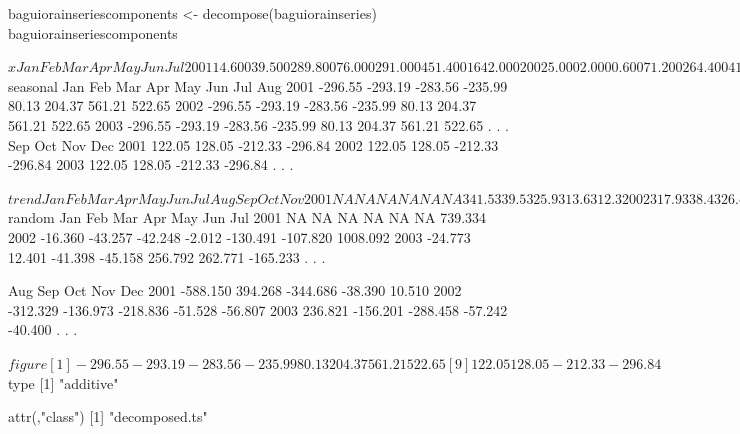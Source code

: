 \begin{center}
\begin{Schunk}
\begin{Sinput}
baguiorainseriescomponents <- decompose(baguiorainseries)
baguiorainseriescomponents
\end{Sinput}
\begin{Soutput}
$x
          Jan      Feb      Mar      Apr      May      Jun      Jul
2001   14.600   39.500  289.800   76.000  291.000  451.400 1642.000
2002    5.000    2.000    0.600   71.200  264.400  411.000 1883.400
2003    9.800   25.400    4.800   46.800  662.700  792.400  721.300
.
.
.

          Aug      Sep      Oct      Nov      Dec
2001  274.000  842.200   97.000   61.600   23.200
2002  525.600  301.500  224.800   67.300   10.000
2003 1089.400  303.200  179.700   60.400    4.400
.
.
.

$seasonal
         Jan     Feb     Mar     Apr     May     Jun     Jul     Aug
2001 -296.55 -293.19 -283.56 -235.99   80.13  204.37  561.21  522.65
2002 -296.55 -293.19 -283.56 -235.99   80.13  204.37  561.21  522.65
2003 -296.55 -293.19 -283.56 -235.99   80.13  204.37  561.21  522.65
.
.
.
         Sep     Oct     Nov     Dec
2001  122.05  128.05 -212.33 -296.84
2002  122.05  128.05 -212.33 -296.84
2003  122.05  128.05 -212.33 -296.84
.
.
.

$trend
       Jan   Feb   Mar   Apr   May   Jun   Jul   Aug   Sep   Oct   Nov
2001    NA    NA    NA    NA    NA    NA 341.5 339.5 325.9 313.6 312.3
2002 317.9 338.4 326.4 309.2 314.8 314.4 314.1 315.3 316.4 315.6 331.2
2003 331.1 306.2 329.8 327.9 325.8 325.3 325.3 329.9 337.4 340.1 330.0
.
.
.

       Dec
2001 309.5
2002 363.7
2003 341.6
.
.
.

$random
          Jan      Feb      Mar      Apr      May      Jun      Jul
2001       NA       NA       NA       NA       NA       NA  739.334
2002  -16.360  -43.257  -42.248   -2.012 -130.491 -107.820 1008.092
2003  -24.773   12.401  -41.398  -45.158  256.792  262.771 -165.233
.
.
.

          Aug      Sep      Oct      Nov      Dec
2001 -588.150  394.268 -344.686  -38.390   10.510
2002 -312.329 -136.973 -218.836  -51.528  -56.807
2003  236.821 -156.201 -288.458  -57.242  -40.400
.
.
.

$figure
 [1] -296.55 -293.19 -283.56 -235.99   80.13  204.37  561.21  522.65
 [9]  122.05  128.05 -212.33 -296.84

$type
[1] "additive"

attr(,"class")
[1] "decomposed.ts"
\end{Soutput}
\end{Schunk}
\end{center}

